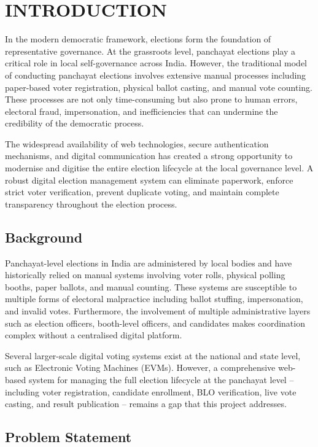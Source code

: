 \chapter{INTRODUCTION}

In the modern democratic framework, elections form the foundation of representative governance. At the grassroots level, panchayat elections play a critical role in local self-governance across India. However, the traditional model of conducting panchayat elections involves extensive manual processes including paper-based voter registration, physical ballot casting, and manual vote counting. These processes are not only time-consuming but also prone to human errors, electoral fraud, impersonation, and inefficiencies that can undermine the credibility of the democratic process.

The widespread availability of web technologies, secure authentication mechanisms, and digital communication has created a strong opportunity to modernise and digitise the entire election lifecycle at the local governance level. A robust digital election management system can eliminate paperwork, enforce strict voter verification, prevent duplicate voting, and maintain complete transparency throughout the election process.

\section{Background}

Panchayat-level elections in India are administered by local bodies and have historically relied on manual systems involving voter rolls, physical polling booths, paper ballots, and manual counting. These systems are susceptible to multiple forms of electoral malpractice including ballot stuffing, impersonation, and invalid votes. Furthermore, the involvement of multiple administrative layers such as election officers, booth-level officers, and candidates makes coordination complex without a centralised digital platform.

Several larger-scale digital voting systems exist at the national and state level, such as Electronic Voting Machines (EVMs). However, a comprehensive web-based system for managing the full election lifecycle at the panchayat level -- including voter registration, candidate enrollment, BLO verification, live vote casting, and result publication -- remains a gap that this project addresses.

\section{Problem Statement}

